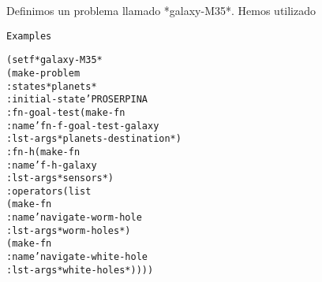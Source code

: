 \begin{aibox}{\function}
\begin{alltt}
\end{alltt}
\end{aibox}

\begin{aibox}{\examples}
\begin{alltt}

\end{alltt}
\end{aibox}

\begin{aibox}{\comments}
Definimos un problema llamado *galaxy-M35*. Hemos utilizado 

\end{aibox}

\begin{aibox}{\pseudocode}
\begin{alltt}
Examples

\end{alltt}
\end{aibox}

\begin{aibox}{\code}
\begin{alltt}

(setf *galaxy-M35*
    (make-problem
        :states *planets*
        :initial-state 'PROSERPINA
        :fn-goal-test (make-fn
                          :name 'fn-f-goal-test-galaxy
                        :lst-args *planets-destination*)
        :fn-h (make-fn
                  :name 'f-h-galaxy
                :lst-args *sensors*)
        :operators (list
                    (make-fn
                        :name 'navigate-worm-hole 
                        :lst-args *worm-holes*)
                    (make-fn
                        :name 'navigate-white-hole
                        :lst-args *white-holes*))))

\end{alltt}
\end{aibox}
